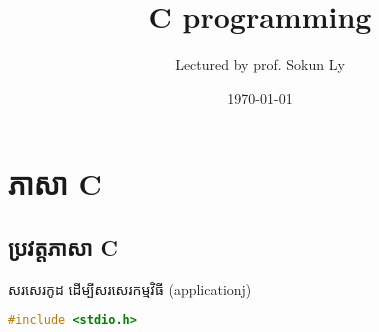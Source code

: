 


\title{C programming}
\author{Lectured by prof. Sokun Ly}
\date{\today}


\maketitle

\chapter{ភាសា C}
\section{ប្រវត្តភាសា C}
សរសេរកូដ ដើម្បីសរសេរកម្មវិធី (applicationj)
\begin{lstlisting}[language=C]
#include <stdio.h>
\end{lstlisting}


